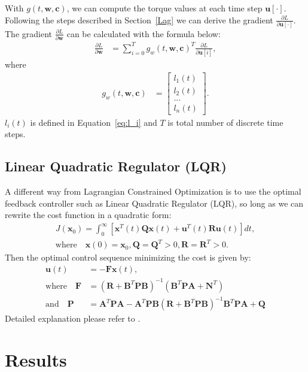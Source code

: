 With $g(t, \mathbf w, \mathbf c)$, we can compute the torque values at each time step $\mathbf u[\cdot]$. Following the steps described in Section~\ref{Lag} we can derive the gradient $\frac{\partial L}{\partial \mathbf u[\cdot]}$. The gradient $\frac{\partial L}{\partial \mathbf w}$ can be calculated with the formula below:
\begin {align}
\frac{\partial L}{\partial \mathbf w} &= \sum_{i = 0}^T g_w(t,\mathbf w, \mathbf c)^T\frac{\partial L}{\partial \mathbf u[i]}, 
\end {align}
where \begin{align}g_w(t,\mathbf w, \mathbf c) & = \begin{bmatrix} l_1(t) \\ l_2(t)\\ ... \\l_n(t) \end{bmatrix}. \nonumber \end{align}
$l_i(t)$ is defined in Equation~\ref{eq:l_i} and $T$ is total number of discrete time steps.
 \subsection{Linear Quadratic Regulator (LQR)}
\null \quad A different way from Lagrangian Constrained Optimization is to use the optimal feedback controller such as Linear Quadratic Regulator (LQR), so long as we can rewrite the cost function in a quadratic form:
\begin{align}
J(\mathbf x_0) =
\int_0^\infty \left[ \mathbf x^T(t) {\mathbf Q} \mathbf x(t) + \mathbf u^T(t) {\mathbf R} \mathbf u(t) \right]dt, \nonumber \\
\text{where}
\quad \mathbf x(0)=\mathbf x_0, {\mathbf Q}={\mathbf Q}^T>0, {\mathbf R}={\mathbf R}^T>0.
\end{align}
Then the optimal control sequence minimizing the cost is given by: 
\begin{align}
\mathbf u(t) &= -\mathbf {Fx}(t), \nonumber\\
\text{where} \quad \mathbf F &= (\mathbf R + \mathbf B^T\mathbf{PB})^{-1}(\mathbf B^T\mathbf{PA} + \mathbf N^T) \nonumber \\
\text{and} \quad \mathbf P &=  \mathbf A^T \mathbf{PA} - \mathbf A^T \mathbf{PB}(\mathbf R+\mathbf B^T \mathbf{PB})^{-1}\mathbf B^T \mathbf{PA} + \mathbf Q 
\end{align}
Detailed explanation please refer to \cite{sontag}.

\section{Results} \label{results}
